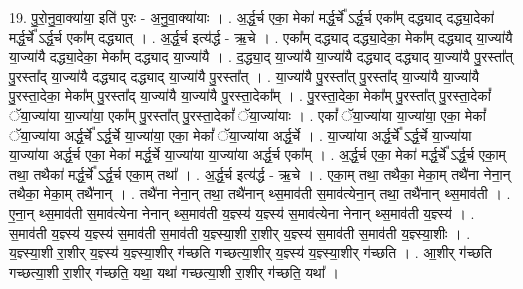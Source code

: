 \documentclass[17pt]{extarticle}
\begin{document}
19. पु॒रो॒नु॒वा॒क्या॑या॒ इति॑ पुरः - अ॒नु॒वा॒क्या॑याः । . अ॒र्द्ध॒र्च एका॒ मेका॑ मर्द्ध॒र्चे᳚ ऽर्द्ध॒र्च एका᳚म् दद्ध्याद् दद्ध्या॒देका॑ मर्द्ध॒र्चे᳚ ऽर्द्ध॒र्च एका᳚म् दद्ध्यात् । . अ॒र्द्ध॒र्च इत्य॑र्द्ध - ऋ॒चे । . एका᳚म् दद्ध्याद् दद्ध्या॒देका॒ मेका᳚म् दद्ध्याद् या॒ज्या॑यै या॒ज्या॑यै दद्ध्या॒देका॒ मेका᳚म् दद्ध्याद् या॒ज्या॑यै । . द॒द्ध्या॒द् या॒ज्या॑यै या॒ज्या॑यै दद्ध्याद् दद्ध्याद् या॒ज्या॑यै पु॒रस्ता᳚त् पु॒रस्ता᳚द् या॒ज्या॑यै दद्ध्याद् दद्ध्याद् या॒ज्या॑यै पु॒रस्ता᳚त् । . या॒ज्या॑यै पु॒रस्ता᳚त् पु॒रस्ता᳚द् या॒ज्या॑यै या॒ज्या॑यै पु॒रस्ता॒देका॒ मेका᳚म् पु॒रस्ता᳚द् या॒ज्या॑यै या॒ज्या॑यै पु॒रस्ता॒देका᳚म् । . पु॒रस्ता॒देका॒ मेका᳚म् पु॒रस्ता᳚त् पु॒रस्ता॒देकां᳚ ॅया॒ज्या॑या या॒ज्या॑या॒ एका᳚म् पु॒रस्ता᳚त् पु॒रस्ता॒देकां᳚ ॅया॒ज्या॑याः । . एकां᳚ ॅया॒ज्या॑या या॒ज्या॑या॒ एका॒ मेकां᳚ ॅया॒ज्या॑या अर्द्ध॒र्चे᳚ ऽर्द्ध॒र्चे या॒ज्या॑या॒ एका॒ मेकां᳚ ॅया॒ज्या॑या अर्द्ध॒र्चे । . या॒ज्या॑या अर्द्ध॒र्चे᳚ ऽर्द्ध॒र्चे या॒ज्या॑या या॒ज्या॑या अर्द्ध॒र्च एका॒ मेका॑ मर्द्ध॒र्चे या॒ज्या॑या या॒ज्या॑या अर्द्ध॒र्च एका᳚म् । . अ॒र्द्ध॒र्च एका॒ मेका॑ मर्द्ध॒र्चे᳚ ऽर्द्ध॒र्च एका॒म् तथा॒ तथैका॑ मर्द्ध॒र्चे᳚ ऽर्द्ध॒र्च एका॒म् तथा᳚ । . अ॒र्द्ध॒र्च इत्य॑र्द्ध - ऋ॒चे । . एका॒म् तथा॒ तथैका॒ मेका॒म् तथै॑ना नेना॒न् तथैका॒ मेका॒म् तथै॑नान् । . तथै॑ना नेना॒न् तथा॒ तथै॑नान् थ्स॒माव॑ती स॒माव॑त्येना॒न् तथा॒ तथै॑नान् थ्स॒माव॑ती । . ए॒ना॒न् थ्स॒माव॑ती स॒माव॑त्येना नेनान् थ्स॒माव॑ती य॒ज्ञ्स्य॑ य॒ज्ञ्स्य॑ स॒माव॑त्येना नेनान् थ्स॒माव॑ती य॒ज्ञ्स्य॑ । . स॒माव॑ती य॒ज्ञ्स्य॑ य॒ज्ञ्स्य॑ स॒माव॑ती स॒माव॑ती य॒ज्ञ्स्या॒शी रा॒शीर् य॒ज्ञ्स्य॑ स॒माव॑ती स॒माव॑ती य॒ज्ञ्स्या॒शीः । . य॒ज्ञ्स्या॒शी रा॒शीर् य॒ज्ञ्स्य॑ य॒ज्ञ्स्या॒शीर् ग॑च्छति गच्छत्या॒शीर् य॒ज्ञ्स्य॑ य॒ज्ञ्स्या॒शीर् ग॑च्छति । . आ॒शीर् ग॑च्छति गच्छत्या॒शी रा॒शीर् ग॑च्छति॒ यथा॒ यथा॑ गच्छत्या॒शी रा॒शीर् ग॑च्छति॒ यथा᳚ । \newline
\end{document}
